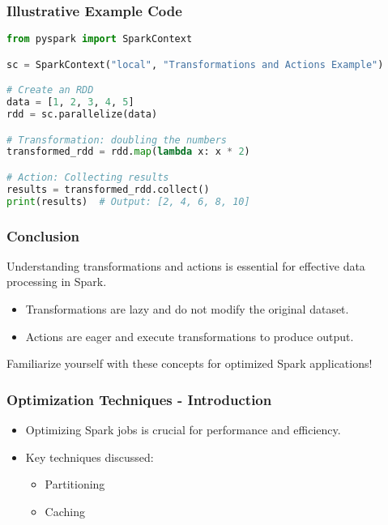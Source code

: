 \documentclass[aspectratio=169]{beamer}
\begin{document}
\begin{frame}[fragile]
    \frametitle{Illustrative Example Code}
    \begin{lstlisting}[language=Python]
from pyspark import SparkContext

sc = SparkContext("local", "Transformations and Actions Example")

# Create an RDD
data = [1, 2, 3, 4, 5]
rdd = sc.parallelize(data)

# Transformation: doubling the numbers
transformed_rdd = rdd.map(lambda x: x * 2)

# Action: Collecting results
results = transformed_rdd.collect()
print(results)  # Output: [2, 4, 6, 8, 10]
    \end{lstlisting}
\end{frame}

\begin{frame}[fragile]
    \frametitle{Conclusion}
    Understanding transformations and actions is essential for effective data processing in Spark.
    \begin{itemize}
        \item Transformations are lazy and do not modify the original dataset.
        \item Actions are eager and execute transformations to produce output.
    \end{itemize}
    Familiarize yourself with these concepts for optimized Spark applications!
\end{frame}

\begin{frame}[fragile]
    \frametitle{Optimization Techniques - Introduction}
    \begin{itemize}
        \item Optimizing Spark jobs is crucial for performance and efficiency.
        \item Key techniques discussed:
        \begin{itemize}
            \item Partitioning
            \item Caching
        \end{itemize}
    \end{itemize}
\end{frame}
\end{document}
